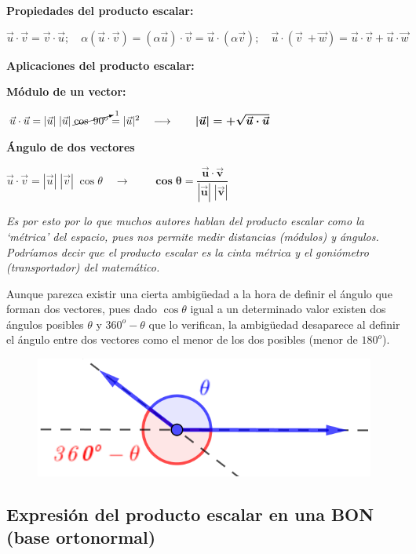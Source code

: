 \noindent \textbf{Propiedades del producto escalar:}

\noindent $\vec u \cdot \vec v=\vec v \cdot \vec u; \quad \alpha (\vec u \cdot \vec v)=(\alpha \vec u) \cdot \vec v= \vec u \cdot (\alpha \vec v); \quad  \vec u \cdot (\vec v\ + \vec w)= \vec u \cdot \vec v+ \vec u \cdot \vec w$


\noindent \textbf{Aplicaciones del producto escalar:}

\textbf{Módulo de un vector:}

$\vec u \cdot \vec u=|\vec u|\; |\vec u|\; \cancelto{1}{\cos\; 90^o}=|\vec u|^2 \quad \longrightarrow \qquad  \boldsymbol{ |\vec u|=+\sqrt{\vec u \cdot \vec u} }$

\textbf{Ángulo de dos vectores}

$\vec u \cdot \vec v=|\vec u|\;|\vec v|\; \cos \theta \quad \longrightarrow \qquad \boldsymbol{ \cos \theta = \dfrac {\vec u \cdot \vec v}{|\vec u|\; |\vec v|} }$

\textit{Es por esto por lo que muchos autores hablan del producto escalar como la `métrica' del espacio, pues nos permite medir distancias (módulos) y ángulos. Podríamos decir que el producto escalar es la cinta métrica y el goniómetro (transportador) del matemático.}

\begin{multicols}{2}
Aunque parezca existir una cierta ambigüedad a la hora de definir el ángulo que forman dos vectores, pues dado $\cos \theta$ igual a un determinado valor existen dos ángulos posibles $\theta$ y $360^o-\theta$ que lo verifican, la ambigüedad desaparece al definir el ángulo entre dos vectores como el menor de los dos posibles (menor de $180^o$).
\begin{figure}[H]
	\centering
	\includegraphics[width=.45\textwidth]{imagenes/imagenes09/T09IM17.png}
\end{figure}
\end{multicols}

\subsection{Expresión del producto escalar en una BON (base ortonormal)}

